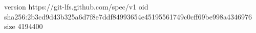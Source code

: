 version https://git-lfs.github.com/spec/v1
oid sha256:2b3cd9d43b325a6d7f8e7ddf84993654e45195561749c0cff69be998a4346976
size 4194400
